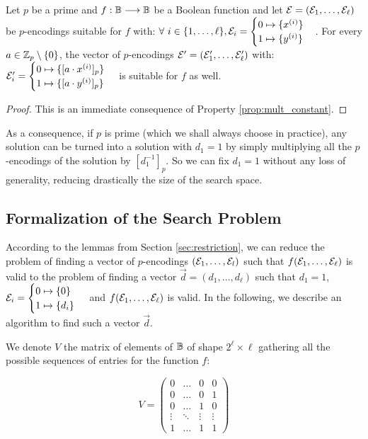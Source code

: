 \begin{lemma}
    Let $p$ be a prime and $f:\mathbb{B} \longrightarrow \mathbb{B}$ be a Boolean function and let $\mathcal{E} = (\mathcal{E}_1, \dots, \mathcal{E}_\ell)$ be $p$-encodings suitable for $f$ with: $\forall~i \in \{1, \dots, \ell\}, \mathcal{E}_i = \begin{cases} 0 \mapsto \{x^{(i)}\} \\ 1 \mapsto \{y^{(i)}\} \end{cases}$. For every $a \in \mathbb{Z}_p \setminus \{0\}$, the vector of $p$-encodings $\mathcal{E} '= (\mathcal{E}'_1, \dots, \mathcal{E}'_\ell)$ with: $\mathcal{E}'_i = \begin{cases} 0 \mapsto \{[a \cdot x^{(i)}]_p\} \\ 1 \mapsto \{[a \cdot y^{(i)}]_p\} \end{cases}$
    is suitable for $f$ as well.
    \label{lemma:multiplication_in_prime_group}
\end{lemma}

\begin{proof}
This is an immediate consequence of Property \ref{prop:mult_constant}.
\end{proof}

As a consequence, if $p$ is prime (which we shall always choose in practice), any solution can be turned into a solution with $d_1 = 1$ by simply multiplying all the $p$-encodings of the solution by $[d_1^{-1}]_p$. So we can fix $d_1 = 1$ without any loss of generality, reducing drastically the size of the search space. 





\subsection{Formalization of the Search Problem}

According to the lemmas from Section \ref{sec:restriction}, we can reduce the problem of finding a vector of $p$-encodings $(\mathcal{E}_1, \dots, \mathcal{E}_l)$ such that $f(\mathcal{E}_1, \dots, \mathcal{E}_\ell)$ is valid to the problem of finding a vector $\vec{d} = (d_1, \dots, d_\ell)$ such that $d_1 = 1$, $\mathcal{E}_i = \begin{cases} 0 \mapsto \{0\} \\ 1 \mapsto \{d_i\} \end{cases}$ and $f(\mathcal{E}_1, \dots, \mathcal{E}_\ell)$ is valid. In the following, we describe an algorithm to find such a vector $\vec d$.


We denote $V$ the matrix of elements of $\mathbb{B}$ of shape $2^\ell \times \ell$ gathering all the possible sequences of entries for the function $f$:

$$V = \left ( \begin{matrix}
0 & \dots & 0 & 0\\
0 & \dots & 0 & 1\\
0 & \dots & 1 & 0\\
\vdots & \ddots & \vdots & \vdots\\
1 & \dots & 1 & 1
\end{matrix}
\right ) $$

